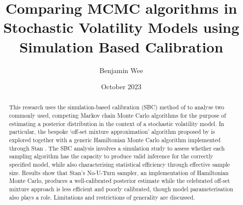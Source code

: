 \documentclass[12pt, a4paper]{article}
\title{Comparing MCMC algorithms in Stochastic Volatility Models using Simulation Based Calibration}
\author{Benjamin Wee}
\date{October 2023}
\begin{document}
\maketitle 

\begin{abstract}

    This research uses the simulation-based calibration (SBC) method of \citet{talts2020validating} to analyse two commonly used, competing Markov chain Monte Carlo algorithms for the purpose of estimating a posterior distribution in the context of a stochastic volatility model. In particular, the bespoke ‘off-set mixture approximation’ algorithm proposed by \citet{kim1998stochastic} is explored together with a generic Hamiltonian Monte Carlo algorithm implemented through Stan \citep{stan}. The SBC analysis involves a simulation study to assess whether each sampling algorithm has the capacity to produce valid inference for the correctly specified model, while also characterising statistical efficiency through effective sample size. Results show that Stan's No-U-Turn sampler, an implementation of Hamiltonian Monte Carlo, produces a well-calibrated posterior estimate while the celebrated off-set mixture approach is less efficient and poorly calibrated, though model parameterisation also plays a role.  Limitations and restrictions of generality are discussed.
    
\end{abstract}

\newpage

\tableofcontents{\protect\newpage}
\end{document}
